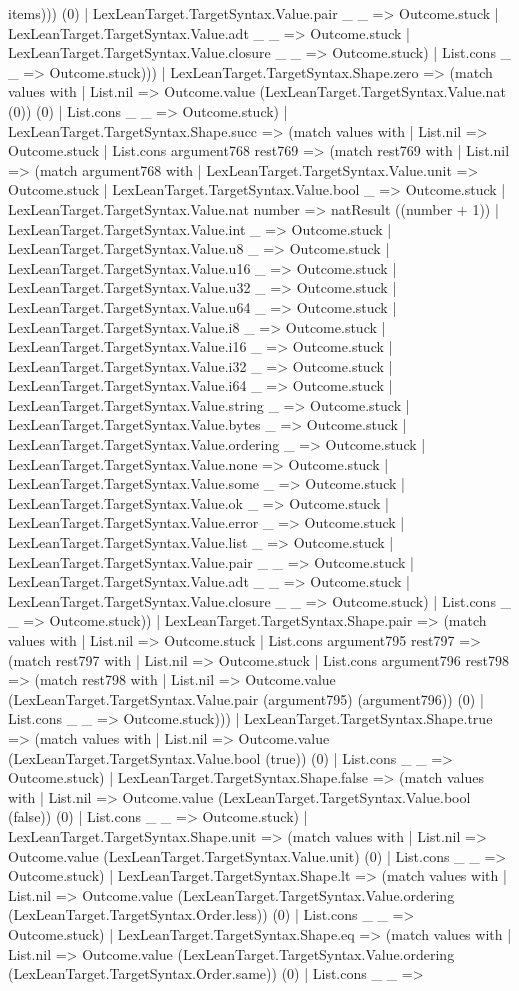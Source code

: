 \documentclass[11pt]{article}
\begin{document}
items))) (0) | LexLeanTarget.TargetSyntax.Value.pair \_ \_ => Outcome.stuck | LexLeanTarget.TargetSyntax.Value.adt \_ \_ => Outcome.stuck | LexLeanTarget.TargetSyntax.Value.closure \_ \_ => Outcome.stuck) | List.cons \_ \_ => Outcome.stuck))) | LexLeanTarget.TargetSyntax.Shape.zero => (match values with | List.nil => Outcome.value (LexLeanTarget.TargetSyntax.Value.nat (0)) (0) | List.cons \_ \_ => Outcome.stuck) | LexLeanTarget.TargetSyntax.Shape.succ => (match values with | List.nil => Outcome.stuck | List.cons argument768 rest769 => (match rest769 with | List.nil => (match argument768 with | LexLeanTarget.TargetSyntax.Value.unit => Outcome.stuck | LexLeanTarget.TargetSyntax.Value.bool \_ => Outcome.stuck | LexLeanTarget.TargetSyntax.Value.nat number => natResult ((number + 1)) | LexLeanTarget.TargetSyntax.Value.int \_ => Outcome.stuck | LexLeanTarget.TargetSyntax.Value.u8 \_ => Outcome.stuck | LexLeanTarget.TargetSyntax.Value.u16 \_ => Outcome.stuck | LexLeanTarget.TargetSyntax.Value.u32 \_ => Outcome.stuck | LexLeanTarget.TargetSyntax.Value.u64 \_ => Outcome.stuck | LexLeanTarget.TargetSyntax.Value.i8 \_ => Outcome.stuck | LexLeanTarget.TargetSyntax.Value.i16 \_ => Outcome.stuck | LexLeanTarget.TargetSyntax.Value.i32 \_ => Outcome.stuck | LexLeanTarget.TargetSyntax.Value.i64 \_ => Outcome.stuck | LexLeanTarget.TargetSyntax.Value.string \_ => Outcome.stuck | LexLeanTarget.TargetSyntax.Value.bytes \_ => Outcome.stuck | LexLeanTarget.TargetSyntax.Value.ordering \_ => Outcome.stuck | LexLeanTarget.TargetSyntax.Value.none => Outcome.stuck | LexLeanTarget.TargetSyntax.Value.some \_ => Outcome.stuck | LexLeanTarget.TargetSyntax.Value.ok \_ => Outcome.stuck | LexLeanTarget.TargetSyntax.Value.error \_ => Outcome.stuck | LexLeanTarget.TargetSyntax.Value.list \_ => Outcome.stuck | LexLeanTarget.TargetSyntax.Value.pair \_ \_ => Outcome.stuck | LexLeanTarget.TargetSyntax.Value.adt \_ \_ => Outcome.stuck | LexLeanTarget.TargetSyntax.Value.closure \_ \_ => Outcome.stuck) | List.cons \_ \_ => Outcome.stuck)) | LexLeanTarget.TargetSyntax.Shape.pair => (match values with | List.nil => Outcome.stuck | List.cons argument795 rest797 => (match rest797 with | List.nil => Outcome.stuck | List.cons argument796 rest798 => (match rest798 with | List.nil => Outcome.value (LexLeanTarget.TargetSyntax.Value.pair (argument795) (argument796)) (0) | List.cons \_ \_ => Outcome.stuck))) | LexLeanTarget.TargetSyntax.Shape.true => (match values with | List.nil => Outcome.value (LexLeanTarget.TargetSyntax.Value.bool (true)) (0) | List.cons \_ \_ => Outcome.stuck) | LexLeanTarget.TargetSyntax.Shape.false => (match values with | List.nil => Outcome.value (LexLeanTarget.TargetSyntax.Value.bool (false)) (0) | List.cons \_ \_ => Outcome.stuck) | LexLeanTarget.TargetSyntax.Shape.unit => (match values with | List.nil => Outcome.value (LexLeanTarget.TargetSyntax.Value.unit) (0) | List.cons \_ \_ => Outcome.stuck) | LexLeanTarget.TargetSyntax.Shape.lt => (match values with | List.nil => Outcome.value (LexLeanTarget.TargetSyntax.Value.ordering (LexLeanTarget.TargetSyntax.Order.less)) (0) | List.cons \_ \_ => Outcome.stuck) | LexLeanTarget.TargetSyntax.Shape.eq => (match values with | List.nil => Outcome.value (LexLeanTarget.TargetSyntax.Value.ordering (LexLeanTarget.TargetSyntax.Order.same)) (0) | List.cons \_ \_ => 
\end{document}
